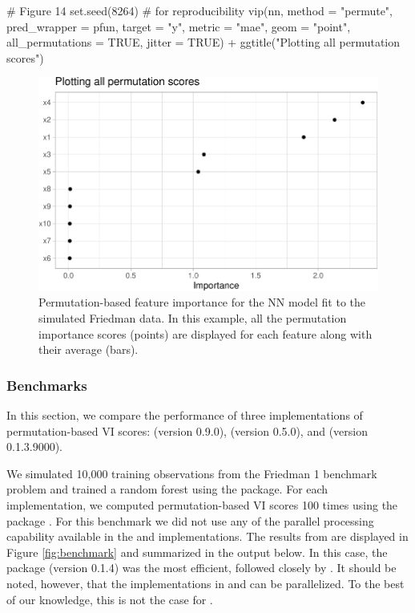 \begin{Schunk}
\begin{Sinput}
# Figure 14
set.seed(8264)  # for reproducibility
vip(nn, method = "permute", pred_wrapper = pfun, target = "y", metric = "mae", 
    geom = "point", all_permutations = TRUE, jitter = TRUE) +
  ggtitle("Plotting all permutation scores")
\end{Sinput}
\begin{figure}[!htb]

{\centering \includegraphics[width=0.7\linewidth]{greenwell-boehmke_files/figure-latex/vip-nn-mae-all-1} 

}

\caption[Permutation-based feature importance for the NN model fit to the simulated Friedman data]{Permutation-based feature importance for the NN model fit to the simulated Friedman data. In this example, all the permutation importance scores (points) are displayed for each feature along with their average (bars).}\label{fig:vip-nn-mae-all}
\end{figure}
\end{Schunk}

\subsubsection{Benchmarks}

In this section, we compare the performance of three implementations of
permutation-based VI scores:  (version 0.9.0),
 (version 0.5.0), and
 (version 0.1.3.9000).

We simulated 10,000 training observations from the Friedman 1 benchmark
problem and trained a random forest using the  package. For
each implementation, we computed permutation-based VI scores 100 times
using the  package \citep{microbenchmark-pkg}.
For this benchmark we did not use any of the parallel processing
capability available in the  and  implementations. The
results from  are displayed in Figure
\ref{fig:benchmark} and summarized in the output below. In this case,
the  package (version 0.1.4) was the most efficient, followed
closely by . It should be noted, however, that the
implementations in  and  can be parallelized. To the
best of our knowledge, this is not the case for .

